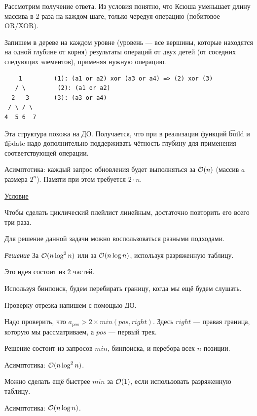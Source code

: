 Рассмотрим получение ответа. Из условия понятно, что Ксюша уменьшает длину массива в 2 раза на каждом шаге, только чередуя операцию (побитовое OR/XOR). 

Запишем в дереве на каждом уровне (уровень --- все вершины, которые находятся на одной глубине от корня) результаты операций от двух детей (от соседних следующих элементов), применяя нужную операцию.

\begin{verbatim}
    1         (1): (a1 or a2) xor (a3 or a4) => (2) xor (3)
   / \	       (2): (a1 or a2) 
  2   3       (3): (a3 or a4)
 / \ / \
4  5 6  7      
\end{verbatim}

Эта структура похожа на ДО. Получается, что при в реализации функций \t{build} и \t{update} надо дополнительно поддерживать чётность глубину для применения соответствующей операции.

Асимптотика: каждый запрос обновления будет выполняться за $\mathcal{O}(n)$ (массив $a$ размера $2^n$). Памяти при этом требуется $2 \cdot n$.


\href{https://codeforces.com/problemset/problem/1237/D}{Условие}

Чтобы сделать циклический плейлист линейным, достаточно повторить его всего три раза.

Для решение данной задачи можно воспользоваться разными подходами. 

{\it Решение } За $ \mathcal{O}(n \log^2 n)$ или за $\mathcal{O}(n \log n)$, используя разряженную таблицу.

Это идея состоит из 2 частей.
\up \up
\begin{MyList}[0pt]
	\item Используя бинпоиск, будем перебирать границу, когда мы ещё будем слушать.
	\item Проверку отрезка напишем с помощью ДО.
	
	Надо проверить, что $a_{pos} > 2 \times min(pos, right)$. Здесь $right$ --- правая граница, которую мы рассматриваем, а $pos$ --- первый трек.
\end{MyList}
\up \up
Решение состоит из запросов $min$, бинпоиска, и перебора всех $n$ позиции.

Асимптотика: $ \mathcal{O}(n \log^2 n)$.
\down

Можно сделать ещё быстрее $min$ за $\mathcal{O}(1)$, если использовать разряженную таблицу.

Асимптотика: $\mathcal{O}(n \log n)$. \href{https://codeforces.com/contest/1237/submission/62698504}{} \href{https://codeforces.com/contest/1237/submission/63401681}{}

